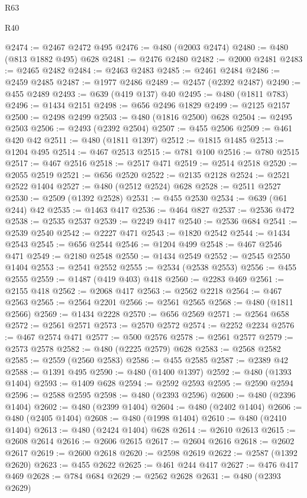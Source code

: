 \begin{lexlean}{R63}
\begin{lexlean}{R40}
\begin{coremodule}
{{{{{{{{{{{{{{{{{{{{{{{{{{{{{{{{{{{{{{{{{{{{{{{{{{{{{{{{{{{{{{{{{{{{{{{{{{{{{{{{{{{{{{{{{{{{{{{{{{{{{{{{{{{{{@2474 := @2467 @2472 @495
@2476 := @480 (@2003 @2474)
@2480 := @480 (@813 @1882 @495) @628
@2481 := @2476 @2480
@2482 := @2000 @2481
@2483 := @2465 @2482
@2484 := @2463 @2483
@2485 := @2461 @2484
@2486 := @2459 @2485
@2487 := @1977 @2486
@2489 := @2457 (@2392 @2487)
@2490 := @455 @2489
@2493 := @639 (@419 @137) @40
@2495 := @480 (@1811 @783)
@2496 := @1434 @2151
@2498 := @656 @2496 @1829
@2499 := @2125 @2157
@2500 := @2498 @2499
@2503 := @480 (@1816 @2500) @628
@2504 := @2495 @2503
@2506 := @2493 (@2392 @2504)
@2507 := @455 @2506
@2509 := @461 @420 @42
@2511 := @480 (@1811 @1397)
@2512 := @1815 @1485
@2513 := @1204 @495
@2514 := @467 @2513
@2515 := @781 @100
@2516 := @780 @2515
@2517 := @467 @2516
@2518 := @2517 @471
@2519 := @2514 @2518
@2520 := @2055 @2519
@2521 := @656 @2520
@2522 := @2135 @2128
@2524 := @2521 @2522 @1404
@2527 := @480 (@2512 @2524) @628
@2528 := @2511 @2527
@2530 := @2509 (@1392 @2528)
@2531 := @455 @2530
@2534 := @639 (@61 @244) @42
@2535 := @1463 @417
@2536 := @464 @827
@2537 := @2536 @472
@2538 := @2535 @2537
@2539 := @2249 @417
@2540 := @2536 @684
@2541 := @2539 @2540
@2542 := @2227 @471
@2543 := @1820 @2542
@2544 := @1434 @2543
@2545 := @656 @2544
@2546 := @1204 @499
@2548 := @467 @2546 @471
@2549 := @2180 @2548
@2550 := @1434 @2549
@2552 := @2545 @2550 @1404
@2553 := @2541 @2552
@2555 := @2534 (@2538 @2553)
@2556 := @455 @2555
@2559 := @1487 (@419 @403) @418
@2560 := @2283 @469
@2561 := @2155 @418
@2562 := @2068 @417
@2563 := @2562 @2218
@2564 := @467 @2563
@2565 := @2564 @2201
@2566 := @2561 @2565
@2568 := @480 (@1811 @2566)
@2569 := @1434 @2228
@2570 := @656 @2569
@2571 := @2564 @658
@2572 := @2561 @2571
@2573 := @2570 @2572
@2574 := @2252 @2234
@2576 := @467 @2574 @471
@2577 := @500 @2576
@2578 := @2561 @2577
@2579 := @2573 @2578
@2582 := @480 (@2225 @2579) @628
@2583 := @2568 @2582
@2585 := @2559 (@2560 @2583)
@2586 := @455 @2585
@2587 := @2389 @42
@2588 := @1391 @495
@2590 := @480 (@1400 @1397)
@2592 := @480 (@1393 @1404)
@2593 := @1409 @628
@2594 := @2592 @2593
@2595 := @2590 @2594
@2596 := @2588 @2595
@2598 := @480 (@2393 @2596)
@2600 := @480 (@2396 @1404)
@2602 := @480 (@2399 @1404)
@2604 := @480 (@2402 @1404)
@2606 := @480 (@2405 @1404)
@2608 := @480 (@1998 @1404)
@2610 := @480 (@2410 @1404)
@2613 := @480 (@2424 @1404) @628
@2614 := @2610 @2613
@2615 := @2608 @2614
@2616 := @2606 @2615
@2617 := @2604 @2616
@2618 := @2602 @2617
@2619 := @2600 @2618
@2620 := @2598 @2619
@2622 := @2587 (@1392 @2620)
@2623 := @455 @2622
@2625 := @461 @244 @417
@2627 := @476 @417 @469
@2628 := @784 @684
@2629 := @2562 @2628
@2631 := @480 (@2393 @2629)
}}}}}}}}}}}}}}}}}}}}}}}}}}}}}}}}}}}}}}}}}}}}}}}}}}}}}}}}}}}}}}}}}}}}}}}}}}}}}}}}}}}}}}}}}}}}}}}}}}}}}}}}}}}}}
\end{coremodule}
\end{lexlean}
\end{lexlean}
